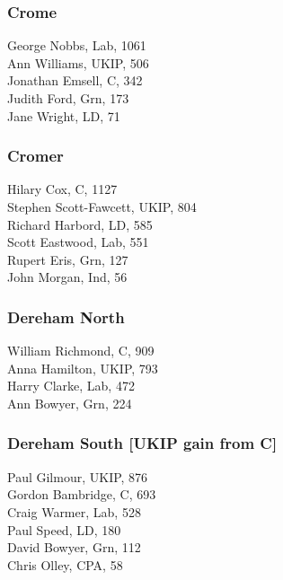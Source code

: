 \documentclass[a4paper,openany,10pt]{book}
\begin{document}
\subsubsection*{Crome}



George Nobbs, Lab, 1061\\
Ann Williams, UKIP, 506\\
Jonathan Emsell, C, 342\\
Judith Ford, Grn, 173\\
Jane Wright, LD, 71\\


\subsubsection*{Cromer}



Hilary Cox, C, 1127\\
Stephen Scott-Fawcett, UKIP, 804\\
Richard Harbord, LD, 585\\
Scott Eastwood, Lab, 551\\
Rupert Eris, Grn, 127\\
John Morgan, Ind, 56\\


\subsubsection*{Dereham North}



William Richmond, C, 909\\
Anna Hamilton, UKIP, 793\\
Harry Clarke, Lab, 472\\
Ann Bowyer, Grn, 224\\


\subsubsection*{Dereham South \hspace*{\fill}\nolinebreak[1]%
\enspace\hspace*{\fill}
[UKIP gain from C]}



Paul Gilmour, UKIP, 876\\
Gordon Bambridge, C, 693\\
Craig Warmer, Lab, 528\\
Paul Speed, LD, 180\\
David Bowyer, Grn, 112\\
Chris Olley, CPA, 58\\
\end{document}
